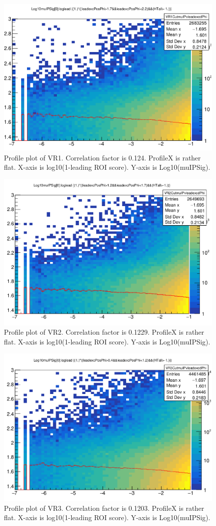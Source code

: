 \begin{figure}[h!]
  \label{fig:valcar1}
  \centering
  \includegraphics[width=0.65\linewidth]{figs/VR1.png}
  \caption{Profile plot of VR1. Correlation factor is 0.124. ProfileX is rather flat. X-axis is log10(1-leading ROI score). Y-axis is Log10(muIPSig).}

\end{figure}

\begin{figure}[h!]
  \label{fig:valcar2}
  \centering
  \includegraphics[width=0.65\linewidth]{figs/VR2.png}
  \caption{Profile plot of VR2. Correlation factor is 0.1229. ProfileX is rather flat. X-axis is log10(1-leading ROI score). Y-axis is Log10(muIPSig).}

\end{figure}

\begin{figure}[h!]
  \label{fig:valcar3}
  \centering
  \includegraphics[width=0.65\linewidth]{figs/VR3.png}
  \caption{Profile plot of VR3. Correlation factor is 0.1203. ProfileX is rather flat. X-axis is log10(1-leading ROI score). Y-axis is Log10(muIPSig).}

\end{figure}


